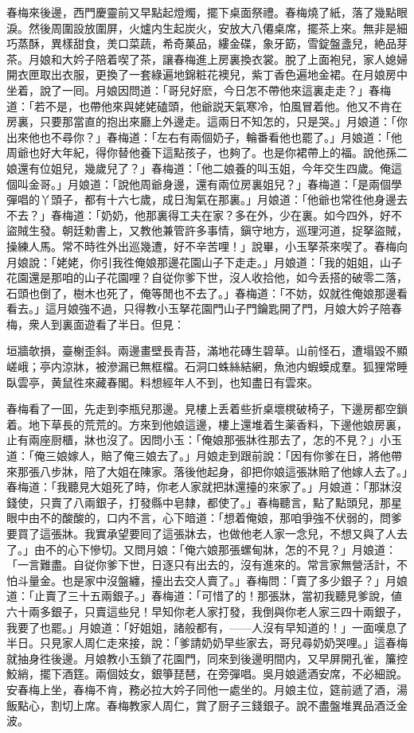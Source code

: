 春梅來後邊，西門慶靈前又早點起燈燭，擺下桌面祭禮。春梅燒了紙，落了幾點眼淚。然後周圍設放圍屏，火爐内生起炭火，安放大八僊桌席，擺茶上來。無非是細巧蒸酥，異樣甜食，羙口菜蔬，希奇菓品，縷金碟，象牙筯，雪錠盤盞兒，絶品芽茶。月娘和大妗子陪着喫了茶，讓春梅進上房裏換衣裳。脫了上面袍兒，家人媳婦開衣匣取出衣服，更換了一套綠遍地錦粧花襖兒，紫丁香色遍地金裙。在月娘房中坐着，說了一囘。月娘因問道：「哥兒好麽，今日怎不帶他來這裏走走？」春梅道：「若不是，也帶他來與姥姥磕頭，他爺説天氣寒冷，怕風冒着他。他又不肯在房裏，只要那當直的抱出來廳上外邊走。這兩日不知怎的，只是哭。」月娘道：「你出來他也不尋你？」春梅道：「左右有兩個奶子，輪番看他也罷了。」月娘道：「他周爺也好大年紀，得你替他養下這點孩子，也夠了。也是你裙帶上的福。說他孫二娘還有位姐兒，幾歲兒了？」春梅道：「他二娘養的叫玉姐，今年交生四歲。俺這個叫金哥。」月娘道：「說他周爺身邊，還有兩位房裏姐兒？」春梅道：「是兩個學彈唱的丫頭子，都有十六七歲，成日淘氣在那裏。」月娘道：「他爺也常徃他身邊去不去？」春梅道：「奶奶，他那裏得工夫在家？多在外，少在裏。如今四外，好不盜賊生發。朝廷勅書上，又教他兼管許多事情，鎭守地方，巡理河道，捉拏盜賊，操練人馬。常不時徃外出巡幾遭，好不辛苦哩！」說畢，小玉拏茶來喫了。春梅向月娘說：「姥姥，你引我徃俺娘那邊花園山子下走走。」月娘道：「我的姐姐，山子花園還是那咱的山子花園哩？自従你爹下世，沒人收拾他，如今丢搭的破零二落，石頭也倒了，樹木也死了，俺等閒也不去了。」春梅道：「不妨，奴就徃俺娘那邊看看去。」這月娘強不過，只得教小玉拏花園門山子門鑰匙開了門，月娘大妗子陪春梅，衆人到裏面遊看了半日。但見：

\begin{myquote}
垣牆欹損，臺榭歪斜。兩邊畫壁長青苔，滿地花磚生碧草。山前怪石，遭塌毀不顯嵯峨；亭内涼牀，被滲漏已無框檔。石洞口蛛絲結網，魚池内蝦蟆成羣。狐狸常睡臥雲亭，黄鼠徃來藏春閣。料想經年人不到，也知盡日有雲來。
\end{myquote}

春梅看了一囬，先走到李瓶兒那邊。見樓上丢着些折桌壞櫈破椅子，下邊房都空鎖着。地下草長的荒荒的。方來到他娘這邊，樓上還堆着生薬香料，下邊他娘房裏，止有兩座厨櫃，牀也沒了。因問小玉：「俺娘那張牀徃那去了，怎的不見？」小玉道：「俺三娘嫁人，賠了俺三娘去了。」月娘走到跟前說：「因有你爹在日，將他帶來那張八步牀，陪了大姐在陳家。落後他起身，卻把你娘這張牀賠了他嫁人去了。」春梅道：「我聽見大姐死了時，你老人家就把牀還擡的來家了。」月娘道：「那牀沒錢使，只賣了八兩銀子，打發縣中皂隸，都使了。」春梅聽言，點了點頭兒，那星眼中由不的酸酸的，口内不言，心下暗道：「想着俺娘，那咱爭強不伏弱的，問爹要買了這張牀。我實承望要囘了這張牀去，也做他老人家一念兒，不想又與了人去了。」由不的心下慘切。又問月娘：「俺六娘那張螺甸牀，怎的不見？」月娘道：「一言難盡。自従你爹下世，日逐只有出去的，沒有進來的。常言家無營活計，不怕斗量金。也是家中沒盤纏，擡出去交人賣了。」春梅問：「賣了多少銀子？」月娘道：「止賣了三十五兩銀子。」春梅道：「可惜了的！那張牀，當初我聽見爹說，値六十兩多銀子，只賣這些兒！早知你老人家打發，我倒與你老人家三四十兩銀子，我要了也罷。」月娘道：「好姐姐，諸般都有，——人沒有早知道的！」一面嘆息了半日。只見家人周仁走來接，說：「爹請奶奶早些家去，哥兒尋奶奶哭哩。」這春梅就抽身徃後邊。月娘教小玉鎖了花園門，同來到後邊明間内，又早屏開孔雀，簾控鮫綃，擺下酒筳。兩個妓女，銀箏琵琶，在旁彈唱。吳月娘遞酒安席，不必細說。安春梅上坐，春梅不肯，務必拉大妗子同他一處坐的。月娘主位，筵前遞了酒，湯飯點心，割切上席。春梅教家人周仁，賞了厨子三錢銀子。說不盡盤堆異品酒泛金波。

